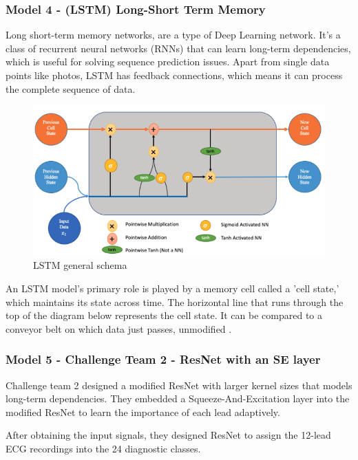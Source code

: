 \subsubsection{Model 4 - (LSTM) Long-Short Term Memory} \label{3model4}

Long short-term memory networks, are a type of Deep Learning network. It's a class of recurrent neural networks (RNNs) that can learn long-term dependencies, which is useful for solving sequence prediction issues. Apart from single data points like photos, LSTM has feedback connections, which means it can process the complete sequence of data.

\begin{figure}[H]
\centering
\includegraphics[scale=0.5]{img/lstm.png}
\caption{LSTM general schema}
\label{fig:lstm}
\end{figure}

An LSTM model's primary role is played by a memory cell called a 'cell state,' which maintains its state across time. The horizontal line that runs through the top of the diagram below represents the cell state. It can be compared to a conveyor belt on which data just passes, unmodified \cite{lstm}.


\subsubsection{Model 5 - Challenge Team 2 - ResNet with an SE layer\cite{second_team} } \label{3model5}

Challenge team 2 designed a modified ResNet with larger kernel sizes that models long-term dependencies. They embedded a Squeeze-And-Excitation layer into the modified ResNet to learn the importance of each lead adaptively. 

After obtaining the input signals, they designed ResNet to assign the 12-lead ECG recordings into the 24 diagnostic classes. 

